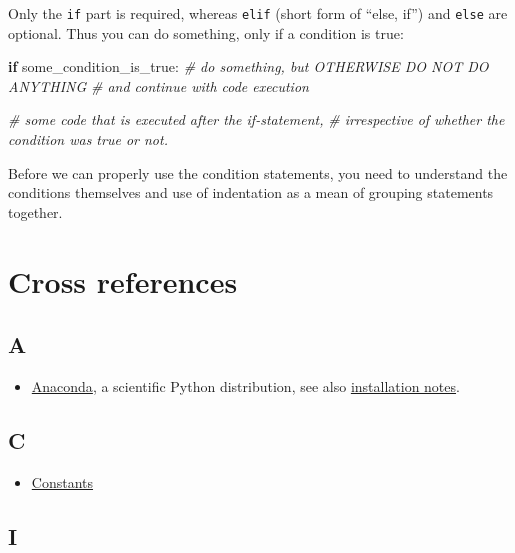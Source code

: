 \documentclass[
]{book}
\newenvironment{Shaded}{\begin{snugshade}}{\end{snugshade}}
\newcommand{\CommentTok}[1]{\textcolor[rgb]{0.56,0.35,0.01}{\textit{#1}}}
\newcommand{\ControlFlowTok}[1]{\textcolor[rgb]{0.13,0.29,0.53}{\textbf{#1}}}
\newcommand{\NormalTok}[1]{#1}
\providecommand{\tightlist}{%
  \setlength{\itemsep}{0pt}\setlength{\parskip}{0pt}}
\begin{document}
Only the \texttt{if} part is required, whereas \texttt{elif} (short form of ``else, if'') and \texttt{else} are optional. Thus you can do something, only if a condition is true:

\begin{Shaded}
\begin{Highlighting}[]
\ControlFlowTok{if}\NormalTok{ some\_condition\_is\_true:}
  \CommentTok{\# do something, but OTHERWISE DO NOT DO ANYTHING }
  \CommentTok{\# and continue with code execution}
  
\CommentTok{\# some code that is executed after the if{-}statement,}
\CommentTok{\# irrespective of whether the condition was true or not.}
\end{Highlighting}
\end{Shaded}

Before we can properly use the condition statements, you need to understand the conditions themselves and use of indentation as a mean of grouping statements together.

\hypertarget{cross-references}{%
\chapter*{Cross references}\label{cross-references}}

\hypertarget{a}{%
\section*{A}\label{a}}

\begin{itemize}
\tightlist
\item
  \href{https://www.anaconda.com}{Anaconda}, a scientific Python distribution, see also \protect\hyperlink{install-anaconda}{installation notes}.
\end{itemize}

\hypertarget{c}{%
\section*{C}\label{c}}

\begin{itemize}
\tightlist
\item
  \protect\hyperlink{constants}{Constants}
\end{itemize}

\hypertarget{i}{%
\section*{I}\label{i}}
\end{document}
